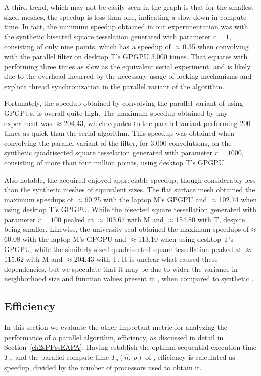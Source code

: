 A third trend, which may not be easily seen in the graph is that for the smallest-sized meshes, the speedup is less than one, indicating a slow down in compute time. In fact, the minimum speedup obtained in our experimentation was with the synthetic bisected square tesselation generated with parameter $r=1$, consisting of only nine points, which has a speedup of $\approx$0.35 when convolving with the parallel filter on desktop T's \gls{GPGPU} 3,000 times. That equates with performing three times as slow as the equivalent serial experiment, and is likely due to the overhead incurred by the necessary usage of locking mechanisms and explicit thread synchronization in the parallel variant of the algorithm.

Fortunately, the speedup obtained by convolving the parallel variant of  using GPGPUs, is overall quite high. The maximum speedup obtained by any experiment was $\approx$204.43, which equates to the parallel variant performing 200 times as quick than the serial algorithm. This speedup was obtained when convolving the parallel variant of the filter, for 3,000 convolutions, on the synthetic quadrisected square tesselation generated with parameter $r=1000$, consisting of more than four million points, using desktop T's \gls{GPGPU}.

Also notable, the acquired \tdd{} enjoyed appreciable speedup, though considerably less than the synthetic meshes of equivalent sizes. The flat surface mesh obtained the maximum speedups of $\approx$60.25 with the laptop M's \gls{GPGPU} and $\approx$102.74 when using desktop T's \gls{GPGPU}. While the bisected square tessellation generated with parameter $r=100$ peaked at $\approx$103.67 with M and $\approx$154.80 with T, despite being smaller. Likewise, the university seal obtained the maximum speedups of$\approx$60.08 with the laptop M's \gls{GPGPU} and $\approx$113.10 when using desktop T's \gls{GPGPU}, while the similarly-sized quadrisected square tessellation peaked at $\approx$115.62 with M and $\approx$204.43 with T. It is unclear what caused these dependencies, but we speculate that it may be due to wider the variance in neighborhood size and function values present in \tdd{}, when compared to synthetic \tdd{}.

%
%
%
%
\subsection{Efficiency}
\label{ch6sCWGssE}
In this section we evaluate the other important metric for analyzing the performance of a parallel algorithm, \gls{efficiency}, as discussed in detail in Section~\ref{ch2sPPssEAPA}. Having establish the optimal sequential execution time $\mathit{T_s}$, and the parallel compute time $\mathit{T_{\rho}}(\hat{n},\,\rho)$ of , \gls{efficiency} is calculated as \gls{speedup}, divided by the number of processors used to obtain it.


